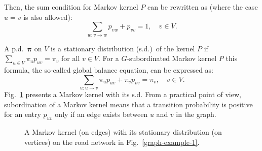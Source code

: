 \documentclass[b5paper,12pt]{report}
\theoremstyle{definition}
\newcommand{\bpi}{\boldsymbol{\pi}}
\begin{document}
Then, the sum condition for Markov kernel $P$ can be rewritten as (where the case $u = v$ is also allowed):
\begin{equation}\label{Psum}
\sum_{w:v \rightarrow w} p_{vw} + p_{vv} = 1, \quad v \in V.
\end{equation}

A p.d.~$\bpi$ on $V$ is a stationary distribution (s.d.)~of the kernel $P$ if $\sum_{u \in V} \pi_u p_{uv} = \pi_v$ for all $v \in V$. For a $G$-subordinated Markov kernel $P$ this formula, the so-called global balance equation, can be expressed as:
\begin{equation}\label{pi_eq}
\sum_{u:u \rightarrow v} \pi_u p_{uv} + \pi_v p_{vv} = \pi_v, \quad v \in V.
\end{equation}
Fig.~\ref{pi_graph} presents a Markov kernel with its s.d. From a practical point of view, subordination of a Markov kernel means that a transition probability is positive for an entry $p_{uv}$ only if an edge exists between $u$ and $v$ in the graph.

\begin{figure}[b!]
\centering
{}
\caption{A Markov kernel (on edges) with its stationary distribution (on vertices) on the road network in Fig.~\ref{graph-example-1}.}
\label{pi_graph}
\end{figure}
\end{document}
